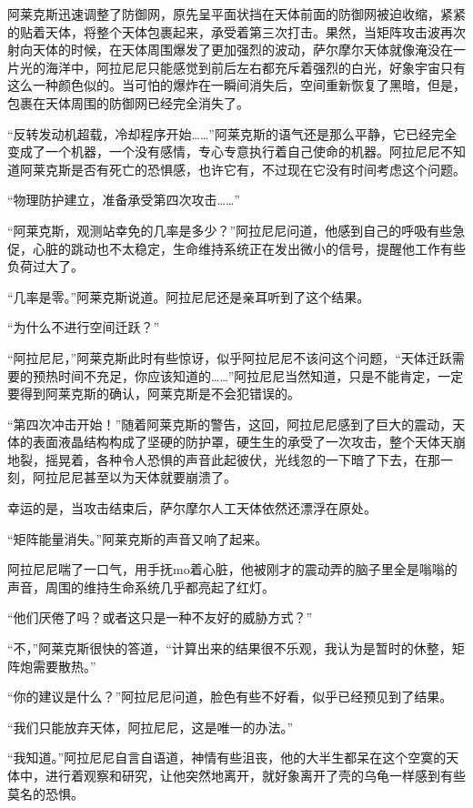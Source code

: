 阿莱克斯迅速调整了防御网，原先呈平面状挡在天体前面的防御网被迫收缩，紧紧的贴着天体，将整个天体包裹起来，承受着第三次打击。果然，当矩阵攻击波再次射向天体的时候，在天体周围爆发了更加强烈的波动，萨尔摩尔天体就像淹没在一片光的海洋中，阿拉尼尼只能感觉到前后左右都充斥着强烈的白光，好象宇宙只有这么一种颜色似的。当可怕的爆炸在一瞬间消失后，空间重新恢复了黑暗，但是，包裹在天体周围的防御网已经完全消失了。

“反转发动机超载，冷却程序开始……”阿莱克斯的语气还是那么平静，它已经完全变成了一个机器，一个没有感情，专心专意执行着自己使命的机器。阿拉尼尼不知道阿莱克斯是否有死亡的恐惧感，也许它有，不过现在它没有时间考虑这个问题。

“物理防护建立，准备承受第四次攻击……”

“阿莱克斯，观测站幸免的几率是多少？”阿拉尼尼问道，他感到自己的呼吸有些急促，心脏的跳动也不太稳定，生命维持系统正在发出微小的信号，提醒他工作有些负荷过大了。

“几率是零。”阿莱克斯说道。阿拉尼尼还是亲耳听到了这个结果。

“为什么不进行空间迁跃？”

“阿拉尼尼，”阿莱克斯此时有些惊讶，似乎阿拉尼尼不该问这个问题，“天体迁跃需要的预热时间不充足，你应该知道的……”阿拉尼尼当然知道，只是不能肯定，一定要得到阿莱克斯的确认，阿莱克斯是不会犯错误的。

“第四次冲击开始！”随着阿莱克斯的警告，这回，阿拉尼尼感到了巨大的震动，天体的表面液晶结构构成了坚硬的防护罩，硬生生的承受了一次攻击，整个天体天崩地裂，摇晃着，各种令人恐惧的声音此起彼伏，光线忽的一下暗了下去，在那一刻，阿拉尼尼甚至以为天体就要崩溃了。

幸运的是，当攻击结束后，萨尔摩尔人工天体依然还漂浮在原处。

“矩阵能量消失。”阿莱克斯的声音又响了起来。

阿拉尼尼喘了一口气，用手抚mo着心脏，他被刚才的震动弄的脑子里全是嗡嗡的声音，周围的维持生命系统几乎都亮起了红灯。

“他们厌倦了吗？或者这只是一种不友好的威胁方式？”

“不，”阿莱克斯很快的答道，“计算出来的结果很不乐观，我认为是暂时的休整，矩阵炮需要散热。”

“你的建议是什么？”阿拉尼尼问道，脸色有些不好看，似乎已经预见到了结果。

“我们只能放弃天体，阿拉尼尼，这是唯一的办法。”

“我知道。”阿拉尼尼自言自语道，神情有些沮丧，他的大半生都呆在这个空寞的天体中，进行着观察和研究，让他突然地离开，就好象离开了壳的乌龟一样感到有些莫名的恐惧。


